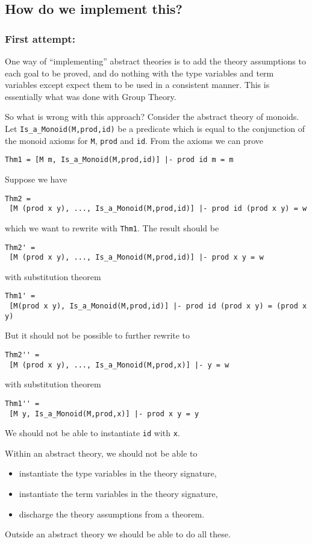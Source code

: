 \subsection*{How do we implement this?}
\subsubsection*{First attempt:}
One way of ``implementing'' abstract theories is to add the theory
assumptions to each goal to be proved, and do nothing with the type
variables and term variables except expect them to be used in a
consistent manner.  This is essentially what was done with Group
Theory.

So what is wrong with this approach?  Consider the abstract theory of
monoids.  Let {\tt Is\_a\_Monoid(M,prod,id)} be a predicate which is
equal to the conjunction of the monoid axioms for {\tt M}, {\tt prod}
and {\tt id}.  From the axioms we can prove
\begin{verbatim}
Thm1 = [M m, Is_a_Monoid(M,prod,id)] |- prod id m = m
\end{verbatim}
Suppose we have
\begin{verbatim}
Thm2 =
 [M (prod x y), ..., Is_a_Monoid(M,prod,id)] |- prod id (prod x y) = w
\end{verbatim}
which we want to rewrite with {\tt Thm1}.  The result should be
\begin{verbatim}
Thm2' =
 [M (prod x y), ..., Is_a_Monoid(M,prod,id)] |- prod x y = w
\end{verbatim}
with substitution theorem
\begin{verbatim}
Thm1' =
 [M(prod x y), Is_a_Monoid(M,prod,id)] |- prod id (prod x y) = (prod x y)
\end{verbatim}
But it should not be possible to further rewrite to
\begin{verbatim}
Thm2'' =
 [M (prod x y), ..., Is_a_Monoid(M,prod,x)] |- y = w
\end{verbatim}
with substitution theorem
\begin{verbatim}
Thm1'' =
 [M y, Is_a_Monoid(M,prod,x)] |- prod x y = y
\end{verbatim}
We should not be able to instantiate {\tt id} with {\tt x}.

Within an abstract theory, we should not be able to
\begin{itemize}
\item instantiate the type variables in the theory signature,
\item instantiate the term variables in the theory signature,
\item discharge the theory assumptions from a theorem.
\end{itemize}
Outside an abstract theory we should be able to do all these.

